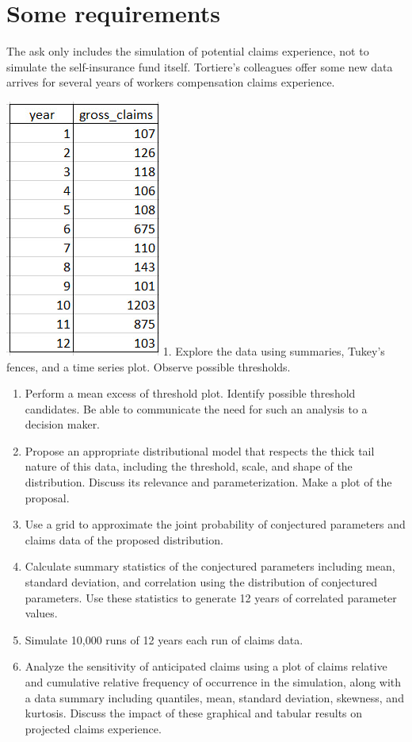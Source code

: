 \documentclass[
]{book}
\begin{document}
\hypertarget{some-requirements}{%
\section{Some requirements}\label{some-requirements}}

The ask only includes the simulation of potential claims experience, not to simulate the self-insurance fund itself. Tortiere's colleagues offer some new data arrives for several years of workers compensation claims experience.

\includegraphics{images/06/claims-data-new.jpg}
1. Explore the data using summaries, Tukey's fences, and a time series plot. Observe possible thresholds.

\begin{enumerate}
\def\labelenumi{\arabic{enumi}.}
\setcounter{enumi}{1}
\item
  Perform a mean excess of threshold plot. Identify possible threshold candidates. Be able to communicate the need for such an analysis to a decision maker.
\item
  Propose an appropriate distributional model that respects the thick tail nature of this data, including the threshold, scale, and shape of the distribution. Discuss its relevance and parameterization. Make a plot of the proposal.
\item
  Use a grid to approximate the joint probability of conjectured parameters and claims data of the proposed distribution.
\item
  Calculate summary statistics of the conjectured parameters including mean, standard deviation, and correlation using the distribution of conjectured parameters. Use these statistics to generate 12 years of correlated parameter values.
\item
  Simulate 10,000 runs of 12 years each run of claims data.
\item
  Analyze the sensitivity of anticipated claims using a plot of claims relative and cumulative relative frequency of occurrence in the simulation, along with a data summary including quantiles, mean, standard deviation, skewness, and kurtosis. Discuss the impact of these graphical and tabular results on projected claims experience.
\end{enumerate}

  
\end{document}
